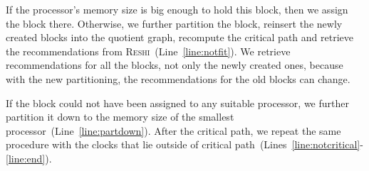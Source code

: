 \documentclass[11pt]{article}
\newcommand{\algo}[1]{\textsc{#1}}
\newcommand{\reshi}{\algo{Reshi}\xspace}
\begin{document}
    If the processor's memory size is big enough to hold this block, then we assign the block there.
    Otherwise, we further partition the block, reinsert the newly created blocks into the quotient graph, recompute the
    critical path and retrieve the recommendations from \reshi~(Line~\ref{line:notfit}).
    We retrieve recommendations for all the blocks, not only the newly created ones, because with the new partitioning,
    the recommendations for the old blocks can change.

    If the block could not have been assigned to any suitable processor, we further partition it down to the memory size
    of the smallest processor~(Line~\ref{line:partdown}).
    After the critical path, we repeat the same procedure with the clocks that lie outside of critical path~(Lines~\ref{line:notcritical}-\ref{line:end}).
\end{document}
